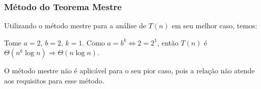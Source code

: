 \subsubsection{Método do Teorema Mestre}

Utilizando o método mestre para a análise de $T(n)$ em seu melhor caso, temos:

Tome \( a = 2 \), \( b = 2 \), \( k = 1 \). Como \( a = b^k \Leftrightarrow 2 = 2^1 \), então \( T(n) \) é \( \Theta(n^k \log{n}) \Rightarrow \Theta(n \log{n}) \).

O método mestre não é aplicável para o seu pior caso, pois a relação não atende aos requisitos para esse método.